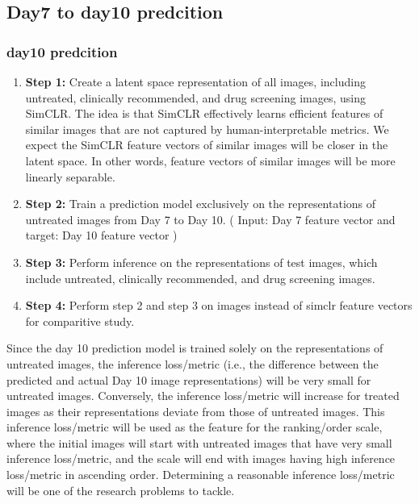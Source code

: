 \subsection{Day7 to day10 predcition} \label{subsec:day7-to-day10}
\subsubsection{day10 predcition}
\begin{enumerate}
    \item \textbf{Step 1:} Create a latent space representation of all images, including untreated, clinically recommended, 
    and drug screening images, using SimCLR. 
    The idea is that SimCLR effectively learns efficient features of similar images that are not captured by 
    human-interpretable metrics. We expect the SimCLR feature vectors of similar images will be closer in the latent space. 
    In other words, feature vectors of similar images will be more linearly separable.
  
  \item \textbf{Step 2:} Train a prediction model exclusively on the representations of 
  untreated images from Day 7 to Day 10. ( Input: Day 7 feature vector and target: Day 10 feature vector )

  
  \item \textbf{Step 3:} Perform inference on the representations of test images, which include untreated, clinically recommended, and drug screening images.
  \item \textbf{Step 4:} Perform step 2 and step 3 on images instead of simclr feature vectors for comparitive study.
\end{enumerate}

Since the day 10 prediction model is trained solely on the representations of untreated images, the inference loss/metric 
(i.e., the difference between the predicted and actual Day 10 image representations) will be very small for untreated images.
 Conversely, the inference loss/metric will increase for treated images as their representations deviate from those of untreated images.
This inference loss/metric will be used as the feature for the ranking/order scale, where the initial images will start 
with untreated images that have very small inference loss/metric, and the scale will end with images having high inference loss/metric in ascending order. 
Determining a reasonable inference loss/metric will be one of the research problems to tackle.

